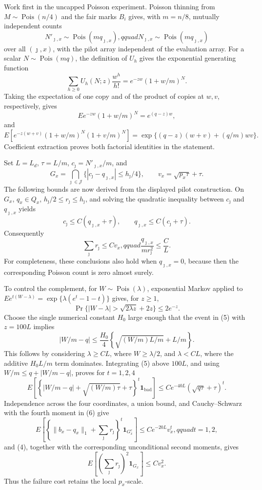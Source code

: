 Work first in the uncapped Poisson experiment.  Poisson thinning from \(M\sim\operatorname{Pois}(n/4)\) and the fair marks \(B_i\) gives, with \(m=n/8\), mutually independent counts
\[
 N'_{\jmath,x}\sim\operatorname{Pois}(mq_{\jmath,x}),qquad
 N_{\jmath,x}\sim\operatorname{Pois}(mq_{\jmath,x})
\]
over all \((\jmath,x)\), with the pilot array independent of the evaluation array.  For a scalar \(N\sim\operatorname{Pois}(mq)\), the definition of \(U_h\) gives the exponential generating function
\[
 \sum_{h\geq0}U_h(N;z)\frac{w^h}{h!}=e^{-zw}(1+w/m)^N.
\]
Taking the expectation of one copy and of the product of copies at \(w,v\), respectively, gives
\[
 E e^{-zw}(1+w/m)^N=e^{(q-z)w},
\]
and
\[
 E\!\left[e^{-z(w+v)}(1+w/m)^N(1+v/m)^N\right]
 =\exp\{(q-z)(w+v)+(q/m)wv\}.
\]
Coefficient extraction proves both factorial identities in the statement.

Set \(L=L_d\), \(\tau=L/m\), \(c_\jmath=N'_{\jmath,x}/m\), and
\[
 G_x=\bigcap_{\jmath\in\mathcal J}\bigl\{|c_\jmath-q_{\jmath,x}|\leq h_\jmath/4\bigr\},
 \qquad v_x=\sqrt{p_x\tau}+\tau.
\]
The following bounds are now derived from the displayed pilot construction.  On \(G_x\), \(q_x\in Q_x\), \(h_\jmath/2\leq r_\jmath\leq h_\jmath\), and solving the quadratic inequality between \(c_\jmath\) and \(q_{\jmath,x}\) yields
\[
 c_\jmath\leq C(q_{\jmath,x}+\tau),\qquad
 q_{\jmath,x}\leq C(c_\jmath+\tau).
\]
Consequently
\[
 \sum_\jmath r_\jmath\leq Cv_x,qquad
 \frac{q_{\jmath,x}}{mr_\jmath^2}\leq\frac C L.                     \tag{4}
\]
For completeness, these conclusions also hold when \(q_{\jmath,x}=0\), because then the corresponding Poisson count is zero almost surely.

To control the complement, for \(W\sim\operatorname{Pois}(\lambda)\), exponential Markov applied to
\(E e^{t(W-\lambda)}=\exp\{\lambda(e^t-1-t)\}\) gives, for \(z\geq1\),
\[
 \Pr\{|W-\lambda|>\sqrt{2\lambda z}+2z\}\leq2e^{-z}.                \tag{5}
\]
Choose the single numerical constant \(H_0\) large enough that the event in (5) with \(z=100L\) implies
\[
 |W/m-q|\leq\frac{H_0}{4}\left\{\sqrt{(W/m)L/m}+L/m\right\}.
\]
This follows by considering \(\lambda\geq C L\), where \(W\geq\lambda/2\), and \(\lambda<CL\), where the additive \(H_0L/m\) term dominates.  Integrating (5) above \(100L\), and using \(W/m\leq q+|W/m-q|\), proves for \(t=1,2,4\)
\[
 E\left[\left\{|W/m-q|+\sqrt{(W/m)\tau}+\tau\right\}^t
       \mathbf1_{\mathrm{bad}}\right]
 \leq C e^{-40L}(\sqrt{q\tau}+\tau)^t.                              \tag{6}
\]
Independence across the four coordinates, a union bound, and Cauchy--Schwarz with the fourth moment in (6) give
\[
 E\left[\left\{\|b_x-q_x\|_1+\sum_\jmath r_\jmath\right\}^t
       \mathbf1_{G_x^c}\right]
 \leq C e^{-20L}v_x^t,qquad t=1,2,                                  \tag{7}
\]
and (4), together with the corresponding unconditional second moments, gives
\[
 E\left[\left(\sum_\jmath r_\jmath\right)^2\mathbf1_{G_x}\right]
 \leq Cv_x^2.                                                         \tag{8}
\]
Thus the failure cost retains the local \(p_x\)-scale.

